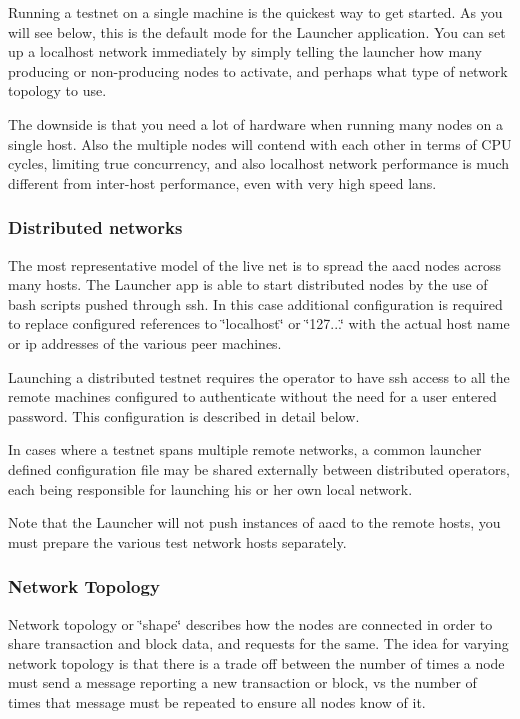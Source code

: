 Running a testnet on a single machine is the quickest way to get started. As you will see below, this is the default mode for the Launcher application. You can set up a localhost network immediately by simply telling the launcher how many producing or non-\/producing nodes to activate, and perhaps what type of network topology to use.

The downside is that you need a lot of hardware when running many nodes on a single host. Also the multiple nodes will contend with each other in terms of C\+PU cycles, limiting true concurrency, and also localhost network performance is much different from inter-\/host performance, even with very high speed lans.

\subsubsection*{Distributed networks}

The most representative model of the live net is to spread the aacd nodes across many hosts. The Launcher app is able to start distributed nodes by the use of bash scripts pushed through ssh. In this case additional configuration is required to replace configured references to \char`\"{}localhost\char`\"{} or \char`\"{}127...\char`\"{} with the actual host name or ip addresses of the various peer machines.

Launching a distributed testnet requires the operator to have ssh access to all the remote machines configured to authenticate without the need for a user entered password. This configuration is described in detail below.

In cases where a testnet spans multiple remote networks, a common launcher defined configuration file may be shared externally between distributed operators, each being responsible for launching his or her own local network.

Note that the Launcher will not push instances of aacd to the remote hosts, you must prepare the various test network hosts separately.

\subsubsection*{Network Topology}

Network topology or \char`\"{}shape\char`\"{} describes how the nodes are connected in order to share transaction and block data, and requests for the same. The idea for varying network topology is that there is a trade off between the number of times a node must send a message reporting a new transaction or block, vs the number of times that message must be repeated to ensure all nodes know of it.

